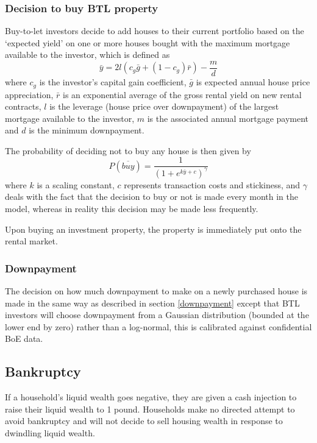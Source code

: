 \documentclass{report}
\begin{document}
\subsubsection{Decision to buy BTL property}
Buy-to-let investors decide to add houses to their current portfolio based on the `expected yield' on one or more houses bought with the maximum mortgage available to the investor, which is defined as
\begin{equation}
\bar{y} = 2l(c_g \bar{g} + (1-c_g)\bar{r}) - \frac{m}{d} 
\end{equation}
where $c_g$ is the investor's capital gain coefficient, $\bar{g}$ is expected annual house price appreciation, $\bar{r}$ is an exponential average of the gross rental yield on new rental contracts, $l$ is the leverage (house price over downpayment) of the largest mortgage available to the investor, $m$ is the associated annual mortgage payment and $d$ is the minimum downpayment.

The probability of deciding not to buy any house is then given by
\begin{equation}
P(\overline{buy}) = \frac{1}{(1 + e^{k\bar{y}+c})^\gamma}
\end{equation}
where $k$ is a scaling constant, $c$ represents transaction costs and stickiness, and $\gamma$ deals with the fact that the decision to buy or not is made every month in the model, whereas in reality this decision may be made less frequently.

Upon buying an investment property, the property is immediately put onto the rental market.

\subsubsection{Downpayment}
The decision on how much downpayment to make on a newly purchased house is made in the same way as described in section \ref{downpayment} except that BTL investors will choose downpayment from a Gaussian distribution (bounded at the lower end by zero) rather than a log-normal, this is calibrated against confidential BoE data.

\subsection{Bankruptcy}
If a household's liquid wealth goes negative, they are given a cash injection to raise their liquid wealth to 1 pound. Households make no directed attempt to avoid bankruptcy and will not decide to sell housing wealth in response to dwindling liquid wealth.
\end{document}
